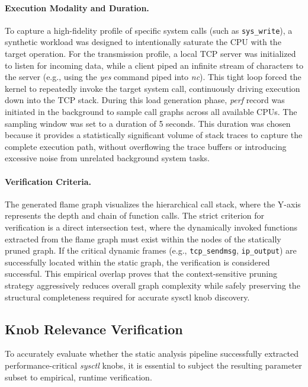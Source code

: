 \paragraph{Execution Modality and Duration.}
To capture a high-fidelity profile of specific system calls (such as \texttt{sys\_write}), a synthetic workload was designed to intentionally saturate the CPU with the target operation.
For the transmission profile, a local TCP server was initialized to listen for incoming data, while a client piped an infinite stream of characters to the server (e.g., using the \textit{yes} command piped into \textit{nc}).
This tight loop forced the kernel to repeatedly invoke the target system call, continuously driving execution down into the TCP stack.
During this load generation phase, \textit{perf} record was initiated in the background to sample call graphs across all available CPUs.
The sampling window was set to a duration of 5 seconds.
This duration was chosen because it provides a statistically significant volume of stack traces to capture the complete execution path, without overflowing the trace buffers or introducing excessive noise from unrelated background system tasks.

\paragraph{Verification Criteria.}
The generated flame graph visualizes the hierarchical call stack, where the Y-axis represents the depth and chain of function calls.
The strict criterion for verification is a direct intersection test, where the dynamically invoked functions extracted from the flame graph must exist within the nodes of the statically pruned graph.
If the critical dynamic frames (e.g., \texttt{tcp\_sendmsg}, \texttt{ip\_output}) are successfully located within the static graph, the verification is considered successful.
This empirical overlap proves that the context-sensitive pruning strategy aggressively reduces overall graph complexity while safely preserving the structural completeness required for accurate sysctl knob discovery.

\subsection{Knob Relevance Verification} \label{subsec:knob_relevanve_verification}

To accurately evaluate whether the static analysis pipeline successfully extracted performance-critical \textit{sysctl} knobs, it is essential to subject the resulting parameter subset to empirical, runtime verification.

